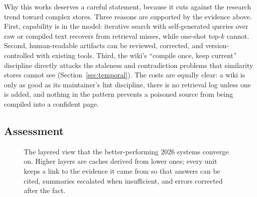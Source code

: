 \documentclass[11pt]{article}
\begin{document}
Why this works deserves a careful statement, because it cuts against the research trend toward complex stores. Three reasons are supported by the evidence above. First, capability is in the model: iterative search with self-generated queries over raw or compiled text recovers from retrieval misses, while one-shot top-$k$ cannot. Second, human-readable artifacts can be reviewed, corrected, and version-controlled with existing tools. Third, the wiki's ``compile once, keep current'' discipline directly attacks the staleness and contradiction problems that similarity stores cannot see (Section~\ref{sec:temporal}). The costs are equally clear: a wiki is only as good as its maintainer's lint discipline, there is no retrieval log unless one is added, and nothing in the pattern prevents a poisoned source from being compiled into a confident page.

\subsection{Assessment}

\begin{figure}[t]
\centering
{}
\caption{The layered view that the better-performing 2026 systems converge on. Higher layers are caches derived from lower ones; every unit keeps a link to the evidence it came from so that answers can be cited, summaries escalated when insufficient, and errors corrected after the fact.}
\label{fig:layers}
\end{figure}
\end{document}
